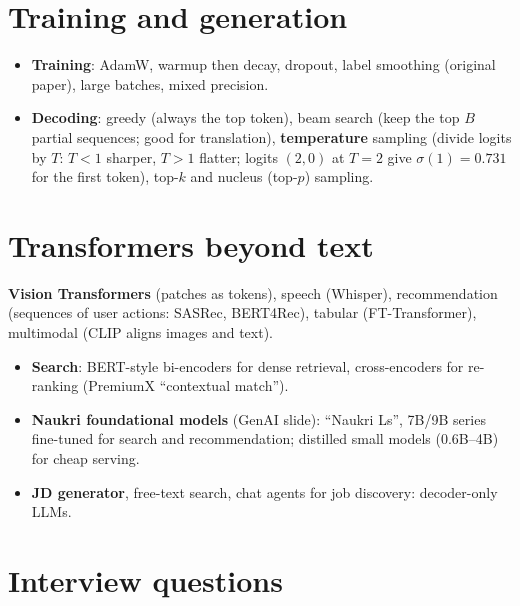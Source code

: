 \section{Training and generation}
\begin{itemize}
\item \textbf{Training}: AdamW, warmup then decay, dropout, label smoothing (original paper), large batches, mixed precision.
\item \textbf{Decoding}: greedy (always the top token), beam search (keep the top $B$ partial sequences; good for translation), \textbf{temperature} sampling
  (divide logits by $T$: $T<1$ sharper, $T>1$ flatter; logits $(2, 0)$ at $T = 2$ give $\sigma(1) = 0.731$ for the first token), top-$k$ and nucleus (top-$p$) sampling.
\end{itemize}

\section{Transformers beyond text}
\textbf{Vision Transformers} (patches as tokens), speech (Whisper), recommendation (sequences of user actions: SASRec, BERT4Rec), tabular (FT-Transformer), multimodal
(CLIP aligns images and text).

\begin{practical}
\begin{itemize}
\item \textbf{Search}: BERT-style bi-encoders for dense retrieval, cross-encoders for re-ranking (PremiumX ``contextual match'').
\item \textbf{Naukri foundational models} (GenAI slide): ``Naukri Ls'', 7B/9B series fine-tuned for search and recommendation; distilled small models (0.6B--4B)
  for cheap serving.
\item \textbf{JD generator}, free-text search, chat agents for job discovery: decoder-only LLMs.
\end{itemize}
\end{practical}

\section{Interview questions}

